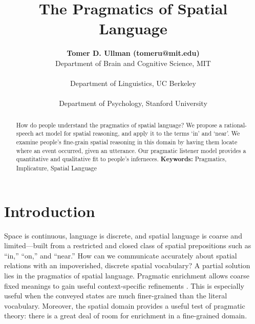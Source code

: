 \documentclass[10pt,letterpaper]{article}
\title{The Pragmatics of Spatial Language}
\author{
{\large \bf Tomer D. Ullman (tomeru@mit.edu)} \\
  Department of Brain and Cognitive Science, MIT\\
  \And{\large \bf Yang Xu (yang\_xu\_ch@berkeley.edu)} \\
  Department of Linguistics, UC Berkeley \\
 \AND{\large \bf Noah D. Goodman (ngoodman@stanford.edu)} \\
  Department of Psychology, Stanford University\\
}
\newcommand{\ndg}[1]{\textcolor{Green}{[ndg: #1]}}
\begin{document}
\maketitle

\begin{abstract}

How do people understand the pragmatics of spatial language? 
We propose a rational-speech act model for spatial reasoning, and apply it to the terms `in' and `near'. We examine people's fine-grain spatial reasoning in this domain by having them locate where an event occurred, given an utterance. Our pragmatic listener model provides a quantitative and qualitative fit to people's inferneces. \textbf{Keywords:}
Pragmatics, Implicature, Spatial Language

\end{abstract}

\section{Introduction} 
Space is continuous, language is discrete, and spatial language is coarse and limited---built from a restricted and closed class of spatial prepositions \cite{talmy83,talmy00,landau93} such as ``in,'' ``on,'' and ``near.'' 
How can we communicate accurately about spatial relations with an impoverished, discrete spatial vocabulary?
A partial solution lies in the pragmatics of spatial language.
Pragmatic enrichment allows coarse fixed meanings to gain useful context-specific refinements \cite{grice75,horn84}.
This is especially useful when the conveyed states are much finer-grained than the literal vocabulary. Moreover, the spatial domain provides a useful test of pragmatic theory: there is a great deal of room for enrichment in a fine-grained domain.

%
\end{document}

